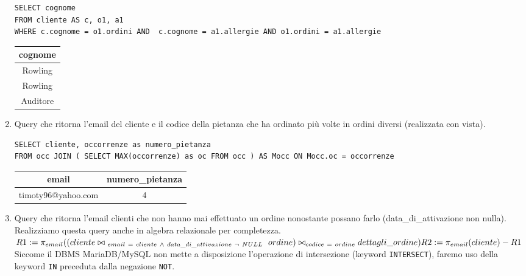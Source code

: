 \documentclass[10pt]{article}
\begin{document}
\begin{enumerate}[noitemsep]
\begin{lstlisting}[style=Mysql]
SELECT cognome
FROM cliente AS c, o1, a1
WHERE c.cognome = o1.ordini AND  c.cognome = a1.allergie AND o1.ordini = a1.allergie
\end{lstlisting}	
\begin{center}
	\begin{table}[H]
		\centering
		\label{table:query3}
		\begin{tabular}{|c|}
			\hline
			\textbf{cognome} \\ \hline
			Rowling          \\ \hline
			Rowling          \\	\hline
			Auditore         \\	\hline
		\end{tabular}
	\end{table}
\end{center}
	\item Query che ritorna l'email del cliente e il codice della pietanza che ha ordinato più volte in ordini diversi (realizzata con vista).
	\begin{lstlisting}[style=Mysql]
SELECT cliente, occorrenze as numero_pietanza
FROM occ JOIN ( SELECT MAX(occorrenze) as oc FROM occ ) AS Mocc ON Mocc.oc = occorrenze	\end{lstlisting}
	\begin{table}[ht]
	\centering
		\label{table:query4}
		\begin{tabular}{|c|c|}
			\hline
			\multirow{1}{*}{\textbf{email}} & \multicolumn{1}{c|}{\textbf{numero\_pietanza}}\\
			\hline
			timoty96@yahoo.com & 4\\ 
			\hline
			\end{tabular}
	\end{table}
	\item Query che ritorna l'email clienti che non hanno mai effettuato un ordine nonostante possano farlo (data\_di\_attivazione non nulla).
	Realizziamo questa query anche in algebra relazionale per completezza.\newline
	$ R1:= \pi_{email}((cliente \bowtie_{\ email\ =\ cliente\ \wedge\ data\_di\_attivazione\ \neg\ NULL} \ ordine)\bowtie_{codice\ = \ ordine} dettagli\_ordine)  \\
	R2:= \pi_{email}(cliente) - R1$ \\
	Siccome il DBMS MariaDB/MySQL non mette a disposizione l'operazione di intersezione (keyword \texttt{INTERSECT}), faremo uso della keyword \texttt{IN} preceduta dalla negazione \texttt{NOT}.
	\begin{lstlisting}[style=Mysql]

\end{lstlisting}
\end{enumerate}
\end{document}
